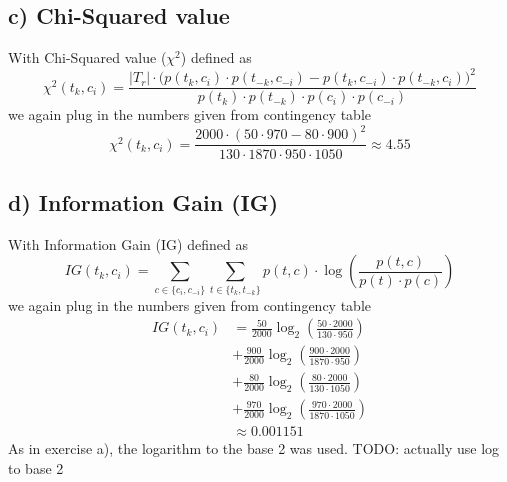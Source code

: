 \documentclass[11pt]{article}
\begin{document}
\subsection*{c) Chi-Squared value}
With Chi-Squared value ($\chi^2$) defined as
\begin{equation}
	\chi^2(t_k, c_i) = \frac{|T_r| \cdot \big( p(t_k, c_i) \cdot p(t_{-k}, c_{-i}) -
						 p(t_{k}, c_{-i}) \cdot p(t_{-k}, c_{i}) \big)^2}
						 {p(t_k) \cdot p(t_{-k}) \cdot p(c_{i}) \cdot p(c_{-i})}
\end{equation}
we again plug in the numbers given from contingency table
\begin{equation}
	\chi^2(t_k, c_i) = \frac{2000 \cdot (50 \cdot 970 - 80 \cdot 900)^2}
					{130 \cdot 1870 \cdot 950 \cdot 1050} 
					\approx 4.55
\end{equation}
\subsection*{d) Information Gain (IG)}
With Information Gain (IG) defined as
\begin{equation}
	IG(t_k, c_i) = \sum_{c \in \{c_i, c_{-i}\}}  \sum_{t \in \{t_k, t_{-k}\}} p(t,c) 
				 \cdot \log \left( \frac{p(t,c)}{p(t) \cdot p(c)} \right)
\end{equation}
we again plug in the numbers given from contingency table
\begin{align*}
	IG(t_k, c_i) &= \frac{50}{2000} \log_2 \left( \frac{50 \cdot 2000}{130 \cdot 950} \right) \\
				 &+ \frac{900}{2000} \log_2 \left( \frac{900 \cdot 2000}{1870 \cdot 950} \right) \\
				 &+ \frac{80}{2000} \log_2 \left( \frac{80 \cdot 2000}{130 \cdot 1050} \right) \\
				 &+ \frac{970}{2000} \log_2 \left( \frac{970 \cdot 2000}{1870 \cdot 1050} \right) \\
				 &\approx 0.001151
\end{align*}
As in exercise a), the logarithm to the base 2 was used.
TODO: actually use log to base 2
\end{document}
